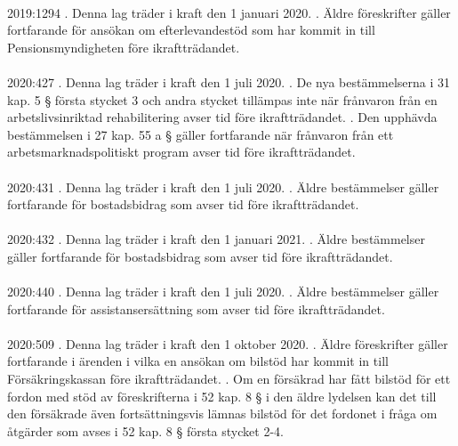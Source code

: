 \documentclass[a4paper,notitlepage,openany,10pt]{book}
\begin{document}
\paragraph*{}
2019:1294
. Denna lag träder i kraft den 1 januari 2020.
. Äldre föreskrifter gäller fortfarande för ansökan om efterlevandestöd som har kommit in till Pensionsmyndigheten före ikraftträdandet.
\paragraph*{}
2020:427
. Denna lag träder i kraft den 1 juli 2020.
. De nya bestämmelserna i 31 kap. 5 § första stycket 3 och andra stycket tillämpas inte när frånvaron från en arbetslivsinriktad rehabilitering avser tid före ikraftträdandet.
. Den upphävda bestämmelsen i 27 kap. 55 a § gäller fortfarande när frånvaron från ett arbetsmarknadspolitiskt program avser tid före ikraftträdandet.
\paragraph*{}
2020:431
. Denna lag träder i kraft den 1 juli 2020.
. Äldre bestämmelser gäller fortfarande för bostadsbidrag som avser tid före ikraftträdandet.
\paragraph*{}
2020:432
. Denna lag träder i kraft den 1 januari 2021.
. Äldre bestämmelser gäller fortfarande för bostadsbidrag som avser tid före ikraftträdandet.
\paragraph*{}
2020:440
. Denna lag träder i kraft den 1 juli 2020.
. Äldre bestämmelser gäller fortfarande för assistansersättning som avser tid före ikraftträdandet.
\paragraph*{}
2020:509
. Denna lag träder i kraft den 1 oktober 2020.
. Äldre föreskrifter gäller fortfarande i ärenden i vilka en ansökan om bilstöd har kommit in till Försäkringskassan före ikraftträdandet.
. Om en försäkrad har fått bilstöd för ett fordon med stöd av föreskrifterna i 52 kap. 8 § i den äldre lydelsen kan det till den försäkrade även fortsättningsvis lämnas bilstöd för det fordonet i fråga om åtgärder som avses i 52 kap. 8 § första stycket 2-4.
\end{document}
